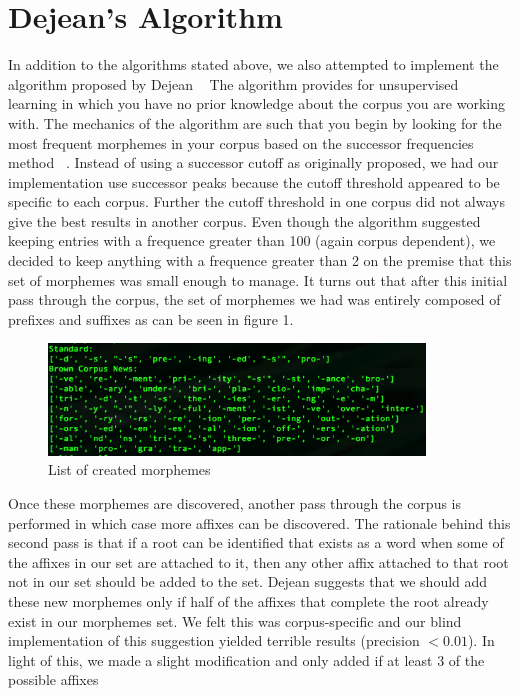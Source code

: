 \documentclass[11pt]{article}
\begin{document}
\section{Dejean's Algorithm}
In addition to the algorithms stated above, we also attempted to implement the
algorithm proposed by Dejean ~\cite{dejean1998-morphemes} The algorithm provides for unsupervised
learning in which you have no prior knowledge about the corpus you are working
with. The mechanics of the algorithm are such that you begin by looking for the
most frequent morphemes in your corpus based on the successor frequencies 
method ~\cite{hafer1974-word}.  Instead of using a successor cutoff as originally proposed,
we had our implementation use successor peaks because the cutoff threshold 
appeared to be specific to each corpus. Further the cutoff threshold in one corpus
did not always give the best results in another corpus. Even though the
algorithm suggested keeping entries with a frequence greater than 100 (again
corpus dependent), we decided to keep anything with a frequence greater than 2
on the premise that this set of morphemes was small enough to manage.
It turns out that after this initial pass through the corpus, the set of 
morphemes we had was entirely composed of prefixes and suffixes as can be seen 
in figure 1.\\
\begin{figure}[h!]
  \includegraphics[width=100mm]{imgs/affixes.png}
  \caption{List of created morphemes}
\end{figure}
Once these morphemes are discovered, another pass through the 
corpus is performed in which case more affixes can be discovered. The rationale
behind this second pass is that if a root can be identified that exists as a 
word when some of the affixes in our set are attached to it, then any other
affix attached to that root not in our set should be added to the set. Dejean
suggests that we should add these new morphemes only if half of the affixes 
that complete the root already exist in our morphemes set. We felt this was
corpus-specific and our blind implementation of this suggestion yielded
terrible results (precision $< 0.01$). In light of this, we made a 
slight modification and only added if at least 3 of the possible affixes
\end{document}
